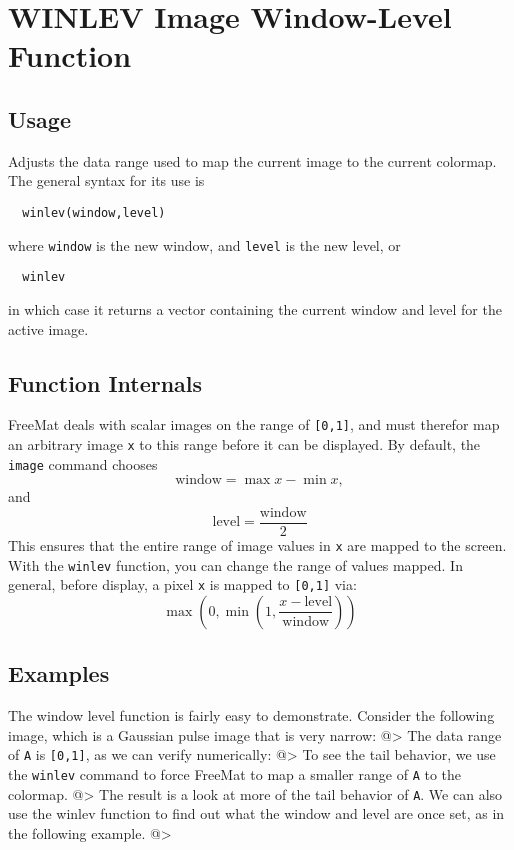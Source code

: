 \section{WINLEV Image Window-Level Function}

\subsection{Usage}

Adjusts the data range used to map the current image to the current
colormap.  The general syntax for its use is
\begin{verbatim}
  winlev(window,level)
\end{verbatim}
where \verb|window| is the new window, and \verb|level| is the new level, or
\begin{verbatim}
  winlev
\end{verbatim}
in which case it returns a vector containing the current window
and level for the active image.
\subsection{Function Internals}

FreeMat deals with scalar images on the range of \verb|[0,1]|, and must
therefor map an arbitrary image \verb|x| to this range before it can
be displayed.  By default, the \verb|image| command chooses 
\[
  \mathrm{window} = \max x - \min x,
\]
and
\[
  \mathrm{level} = \frac{\mathrm{window}}{2}
\]
This ensures that the entire range of image values in \verb|x| are 
mapped to the screen.  With the \verb|winlev| function, you can change
the range of values mapped.  In general, before display, a pixel \verb|x|
is mapped to \verb|[0,1]| via:
\[
   \max\left(0,\min\left(1,\frac{x - \mathrm{level}}{\mathrm{window}}
   \right)\right)
\]
\subsection{Examples}

The window level function is fairly easy to demonstrate.  Consider
the following image, which is a Gaussian pulse image that is very 
narrow:
@>
The data range of \verb|A| is \verb|[0,1]|, as we can verify numerically:
@>
To see the tail behavior, we use the \verb|winlev| command to force FreeMat
to map a smaller range of \verb|A| to the colormap.
@>
The result is a look at more of the tail behavior of \verb|A|.
We can also use the winlev function to find out what the
window and level are once set, as in the following example.
@>
